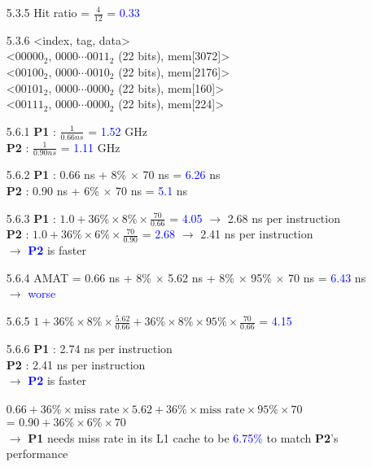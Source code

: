 \documentclass[12pt, a4paper]{article}
\begin{document}
\begin{itemize}[font=\bfseries]
\item[5.3.5] Hit ratio = $\displaystyle \frac{4}{12}$ = \textcolor{blue}{0.33}

\item[5.3.6]
<index, tag, data> \\
<$00000_2$, $0000\cdots0011_2$ (22 bits), mem[3072]> \\
<$00100_2$, $0000\cdots0010_2$ (22 bits), mem[2176]> \\
<$00101_2$, $0000\cdots0000_2$ (22 bits), mem[160]> \\
<$00111_2$, $0000\cdots0000_2$ (22 bits), mem[224]> 

\item[5.6.1]
\textbf{P1} : $\displaystyle \frac{1}{0.66 ns}$ = \textcolor{blue}{1.52} GHz \\
\textbf{P2} : $\displaystyle \frac{1}{0.90 ns}$ = \textcolor{blue}{1.11} GHz

\item[5.6.2]
\textbf{P1} : 0.66 ns + 8\% $\times$ 70 ns = \textcolor{blue}{6.26} ns \\
\textbf{P2} : 0.90 ns + 6\% $\times$ 70 ns = \textcolor{blue}{5.1} ns 

\item[5.6.3]
\textbf{P1} : $\displaystyle 1.0 + 36\% \times 8\% \times \frac{70}{0.66}$ = \textcolor{blue}{4.05} $\rightarrow$ 2.68 ns per instruction \\
\textbf{P2} : $\displaystyle 1.0 + 36\% \times 6\% \times \frac{70}{0.90}$ = \textcolor{blue}{2.68} $\rightarrow$ 2.41 ns per instruction \\ 
$\longrightarrow$ \textcolor{blue}{\textbf{P2}} is faster

\item[5.6.4]
AMAT = 0.66 ns + 8\% $\times$ 5.62 ns + 8\% $\times$ 95\% $\times$ 70 ns = \textcolor{blue}{6.43} ns \\ $\longrightarrow$ \textcolor{blue}{worse} 

\item[5.6.5]
$\displaystyle 1 + 36\% \times 8\% \times \frac{5.62}{0.66} + 36\% \times 8\% \times 95\% \times \frac{70}{0.66}$ = \textcolor{blue}{4.15}

\item[5.6.6]
\textbf{P1} : 2.74 ns per instruction \\
\textbf{P2} : 2.41 ns per instruction \\
$\longrightarrow$ \textcolor{blue}{\textbf{P2}} is faster \\
\vspace*{-0.3cm} \\
$\displaystyle 0.66 + 36\% \times \text{miss rate} \times 5.62 + 36\% \times \text{miss rate} \times 95\% \times 70$ \\ = $\displaystyle 0.90 + 36\% \times 6\% \times 70$ \\
$\longrightarrow$ \textbf{P1} needs miss rate in its L1 cache to be \textcolor{blue}{6.75\%} to match \textbf{P2}'s performance

\end{itemize}
\end{document}
